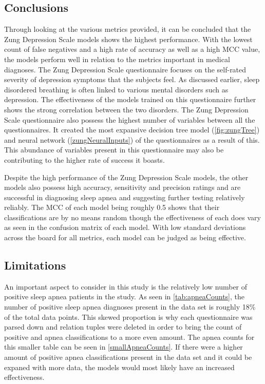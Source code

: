 \documentclass[10pt,conference,a4paper]{IEEEtran}
\begin{document}
\subsection{Conclusions}

Through looking at the various metrics provided, it can be concluded that the Zung Depression Scale models shows the highest performance. With the lowest count of false negatives and a high rate of accuracy as well as a high MCC value, the models perform well in relation to the metrics important in medical diagnoses. The Zung Depression Scale questionnaire focuses on the self-rated severity of depression symptoms that the subjects feel. As discussed earlier, sleep disordered breathing is often linked to various mental disorders such as depression\cite{clevelandClinic}. The effectiveness of the models trained on this questionnaire further shows the strong correlation between the two disorders. The Zung Depression Scale questionnaire also possess the highest number of variables between all the questionnaires. It created the most expansive decision tree model (\autoref{fig:zungTree}) and neural network (\autoref{zungNeuralInputs}) of the questionnaires as a result of this. This abundance of variables present in this questionnaire may also be contributing to the higher rate of success it boasts. \par
Despite the high performance of the Zung Depression Scale models, the other models also possess high accuracy, sensitivity and precision ratings and are successful in diagnosing sleep apnea and suggesting further testing relatively reliably. The MCC of each model being roughly 0.5 shows that their classifications are by no means random though the effectiveness of each does vary as seen in the confusion matrix of each model. With low standard deviations across the board for all metrics, each model can be judged as being effective.


\subsection{Limitations}

An important aspect to consider in this study is the relatively low number of positive sleep apnea patients in the study. As seen in \autoref{tab:apneaCounts}, the number of positive sleep apnea diagnoses present in the data set is roughly 18\% of the total data points. This skewed proportion is why each questionnaire was parsed down and relation tuples were deleted in order to bring the count of positive and apnea classifications to a more even amount. The apnea counts for this smaller table can be seen in \autoref{smallApneaCounts}. If there were a higher amount of positive apnea classifications present in the data set and it could be expaned with more data, the models would most likely have an increased effectiveness.\par
\end{document}
